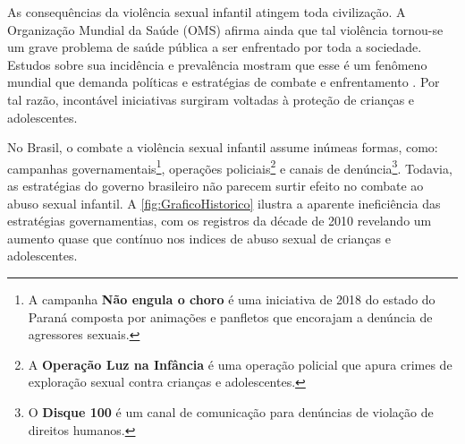
As consequências da violência sexual infantil atingem toda civilização. A Organização Mundial da Saúde (OMS) afirma ainda que tal violência tornou-se um grave problema de saúde pública a ser enfrentado por toda a sociedade. Estudos  sobre  sua  incidência  e   prevalência  mostram  que  esse  é  um fenômeno  mundial que demanda políticas e estratégias de combate e enfrentamento \cite{pinto2017avaliaccao}. Por tal razão, incontável iniciativas surgiram voltadas à proteção de crianças e adolescentes.




No Brasil, o combate a violência sexual infantil assume inúmeas formas, como: campanhas governamentais\footnote{A campanha \textbf{Não engula o choro} é uma iniciativa de 2018 do estado do Paraná composta por animações e panfletos que encorajam a denúncia de agressores sexuais.}, operações policiais\footnote{A \textbf{Operação Luz na Infância} é uma operação policial que apura crimes de exploração sexual contra crianças e adolescentes.} e canais de denúncia\footnote{O \textbf{Disque 100} é um canal de comunicação para denúncias de violação de direitos humanos.}. Todavia, as estratégias do governo brasileiro não parecem surtir efeito no combate ao abuso sexual infantil. A \autoref{fig:GraficoHistorico} ilustra a aparente ineficiência das estratégias governamentias, com os registros da décade de 2010 revelando um aumento quase que contínuo nos indices de abuso sexual de crianças e adolescentes.

